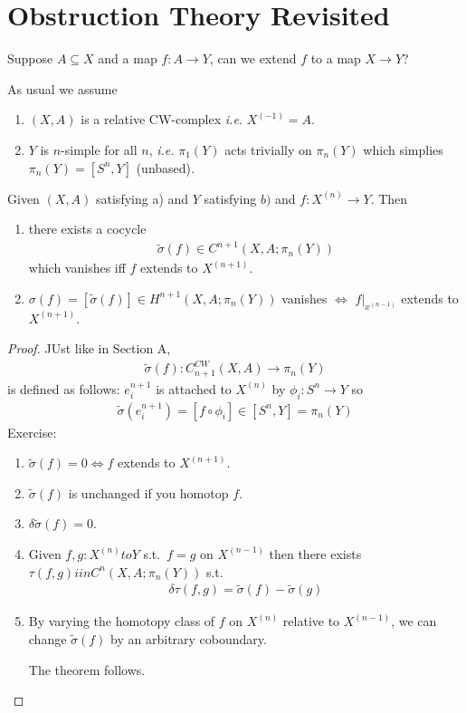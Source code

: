 \documentclass[12pt,class=article,crop=false]{standalone}
\begin{document}
\section{Obstruction Theory Revisited}

Suppose $ A \subseteq X$ and a map $ f: A \to Y$, can we extend $ f$ to a map  $ X \to Y$?

As usual we assume
\begin{enumerate}[label=(\alph*)]
	\item $ (X,A)$ is a relative CW-complex  \emph{i.e.} $ X^{(-1)} = A$.
	\item $ Y$ is  $ n$-simple for all  $ n$,  \emph{i.e.} $ \pi_1(Y)$ acts trivially on $ \pi_n(Y)$ which simplies $ \pi_n(Y) = [S^{n},Y]$ (unbased).
\end{enumerate}

\begin{thm}
Given $ (X,A)$ satisfying  a) and  $ Y$ satisfying  $ b)$ and  $ f: X^{(n)} \to Y$. Then
\begin{enumerate}[label=(\arabic*)]
	\item there exists a cocycle
		\begin{align*}
			\widetilde{ \sigma}(f) \in C^{n+1}(X,A; \pi_n(Y))
		\end{align*}
		which vanishes iff $ f$ extends to  $ X^{(n+1)}$.
	\item $ \sigma(f) = [\widetilde{ \sigma}(f)] \in H^{n+1}(X,A; \pi_n(Y))$ vanishes $ \iff$ $ f|_{x^{(n-1)}}$ extends to $ X^{(n+1)}$.
\end{enumerate}
\end{thm}
\begin{proof}
JUst like in Section A,
\begin{align*}
	\widetilde{ \sigma}(f): C_{n+1}^{CW}(X,A) \to \pi_n(Y)
\end{align*}
is defined as follows:
$ e_i^{n+1}$ is attached to $ X^{(n)}$ by $ \phi_i: S^{n} \to Y$ so
\begin{align*}
	\widetilde{ \sigma}(e_i^{n+1}) = [f \circ \phi_i] \in [S^{n},Y] = \pi_n(Y)
\end{align*}
Exercise:
\begin{enumerate}[label=(\arabic*)]
	\item $ \widetilde{ \sigma}(f) = 0 \iff f$ extends to $ X^{(n+1)}$.
	\item $ \widetilde{ \sigma}(f)$ is unchanged if you homotop $ f$.
	\item  $ \delta \widetilde{ \sigma}(f) = 0$.
	\item Given $ f,g : X^{(n)} to Y$ s.t.\ $ f=g$ on  $ X^{(n-1)}$ then there exists $ \tau(f,g) iin C^{n}(X,A;\pi_n(Y))$ s.t.\ 
		\begin{align*}
			\delta \tau(f,g) = \widetilde{ \sigma}(f) - \widetilde{ \sigma}(g)
		\end{align*}
	\item By varying the homotopy class of $ f$ on  $ X^{(n)}$ relative to $ X^{(n-1)}$, we can change $ \widetilde{ \sigma}(f)$ by an arbitrary coboundary.

The theorem follows.
\end{enumerate}
\end{proof}
\end{document}
